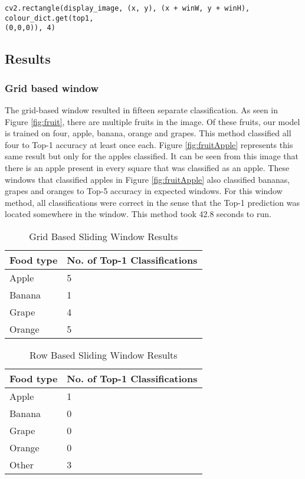 \begin{lstlisting}[style=Python]
cv2.rectangle(display_image, (x, y), (x + winW, y + winH), colour_dict.get(top1,
(0,0,0)), 4)
\end{lstlisting}

\tocless\subsection{Results}
\tocless\subsubsection{Grid based window}
The grid-based window resulted in fifteen separate classification. As seen in Figure
\ref{fig:fruit}, there are multiple fruits in the image. Of these fruits, our
model is trained on four, apple, banana, orange and grapes. This method
classified all four to Top-1 accuracy at least once each.
Figure \ref{fig:fruitApple} represents this same result but only for the apples classified.
It can be seen from this image that there is an apple present in every square that was classified as an apple.
These windows that classified apples in Figure \ref{fig:fruitApple} also classified bananas, grapes and oranges to Top-5 accuracy in expected windows.
For this window method, all classifications were correct in the sense that the Top-1 prediction was located somewhere in the window.
This method took 42.8 seconds to run.


\begin{table}[]
	\centering
	\caption{Grid Based Sliding Window Results}
	\label{my-label}
	\begin{tabular}{|l|l|}
	\hline
		\textbf{Food type} & \textbf{No. of Top-1 Classifications} \\ \hline
		Apple     & 5                      \\ \hline
		Banana    & 1                      \\ \hline
		Grape     & 4                      \\ \hline
		Orange    & 5                     \\ \hline
	\end{tabular}
\end{table}

\begin{table}[]
	\centering
	\caption{Row Based Sliding Window Results}
	\label{rowWindowTable}
	\begin{tabular}{|l|l|}
	\hline
		\textbf{Food type} & \textbf{No. of Top-1 Classifications} \\ \hline
		Apple     & 1                      \\ \hline
		Banana    & 0                      \\ \hline
		Grape     & 0                      \\ \hline
		Orange    & 0                      \\ \hline
		Other     & 3                     \\ \hline
	\end{tabular}
\end{table}

